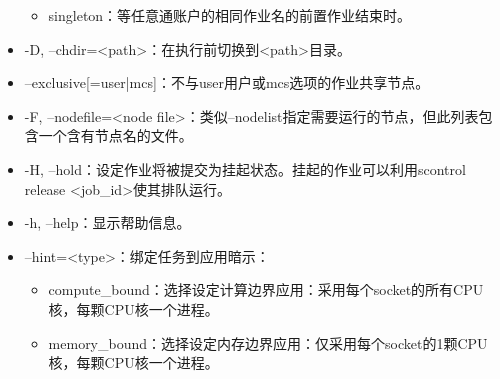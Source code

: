 \begin{itemize}
\begin{itemize}
    \item singleton：等任意通账户的相同作业名的前置作业结束时。
\end{itemize}
    \item -D, --chdir=<path>：在执行前切换到<path>目录。
    \item --exclusive[=user|mcs]：不与user用户或mcs选项的作业共享节点。
    \item -F, --nodefile=<node file>：类似--nodelist指定需要运行的节点，但此列表包含一个含有节点名的文件。
%
     \item -H, --hold：设定作业将被提交为挂起状态。挂起的作业可以利用scontrol release <job\_id>使其排队运行。
     \item -h, --help：显示帮助信息。
     \item --hint=<type>：绑定任务到应用暗示：
\begin{itemize}
	\item compute\_bound：选择设定计算边界应用：采用每个socket的所有CPU核，每颗CPU核一个进程。
    \item memory\_bound：选择设定内存边界应用：仅采用每个socket的1颗CPU核，每颗CPU核一个进程。

\end{itemize}
\end{itemize}
